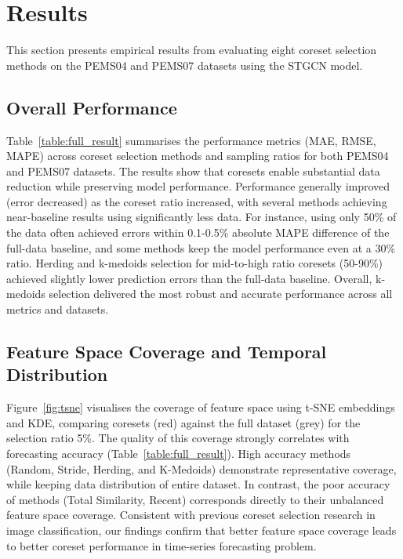 
\section{Results}

This section presents empirical results from evaluating eight coreset selection methods on the PEMS04 and PEMS07 datasets using the STGCN model.


\subsection{Overall Performance}

Table~\ref{table:full_result} summarises the performance metrics (MAE, RMSE, MAPE) across coreset selection methods and sampling ratios for both PEMS04 and PEMS07 datasets. The results show that coresets enable substantial data reduction while preserving model performance. Performance generally improved (error decreased) as the coreset ratio increased, with several methods achieving near-baseline results using significantly less data. For instance, using only 50\% of the data often achieved errors within 0.1-0.5\% absolute MAPE difference of the full-data baseline, and some methods keep the model performance even at a 30\% ratio. Herding and k-medoids selection for mid-to-high ratio coresets (50-90\%) achieved slightly lower prediction errors than the full-data baseline. Overall, k-medoids selection delivered the most robust and accurate performance across all metrics and datasets.




\subsection{Feature Space Coverage and Temporal Distribution}

Figure~\ref{fig:tsne} visualises the coverage of feature space using t-SNE embeddings and KDE, comparing coresets (red) against the full dataset (grey) for the selection ratio 5\%. The quality of this coverage strongly correlates with forecasting accuracy (Table~\ref{table:full_result}). High accuracy methods (Random, Stride, Herding, and K-Medoids) demonstrate representative coverage, while keeping data distribution of entire dataset. In contrast, the poor accuracy of methods (Total Similarity, Recent) corresponds directly to their unbalanced feature space coverage. Consistent with previous coreset selection research in image classification, our findings confirm that better feature space coverage leads to better coreset performance in time-series forecasting problem.



